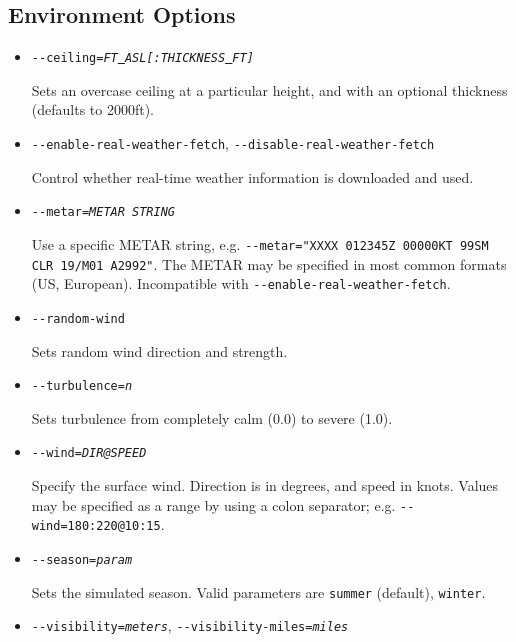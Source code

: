 \subsection{Environment Options}
\begin{itemize}
\item{\texttt{-$ $-ceiling={\it FT\underline{~}ASL[:THICKNESS\underline{~}FT]}}}

Sets an overcase ceiling at a particular height, and with an optional thickness (defaults to 2000ft).

\item{\texttt{-$ $-enable-real-weather-fetch}, \texttt{-$ $-disable-real-weather-fetch}}

Control whether real-time weather information is downloaded and used.

\item{\texttt{-$ $-metar={\it METAR STRING}}}

Use a specific METAR string, e.g. \texttt{-$ $-metar="XXXX 012345Z 00000KT 99SM CLR 19/M01 A2992"}. The METAR may
be specified in most common formats (US, European). Incompatible with \texttt{-$ $-enable-real-weather-fetch}.

\item{\texttt{-$ $-random-wind}}

Sets random wind direction and strength.

\item{\texttt{-$ $-turbulence={\it n}}}

Sets turbulence from completely calm (0.0) to severe (1.0).

\item{\texttt{-$ $-wind={\it DIR@SPEED}}}

Specify the surface wind. Direction is in degrees, and speed in knots. Values may be specified as a range
by using a colon separator; e.g. \texttt{-$ $-wind=180:220@10:15}.

\item{\texttt{-$ $-season={\it param}}}

Sets the simulated season. Valid parameters are \texttt{summer} (default), \texttt{winter}.

\item{\texttt{-$ $-visibility={\it meters}}, \texttt{-$ $-visibility-miles={\it miles}}}

\end{itemize}

